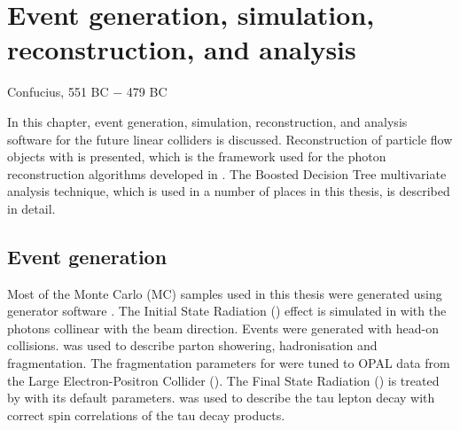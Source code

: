 \chapter{Event generation, simulation, reconstruction, and analysis}
\label{chap:Reconstruction}

%
{Confucius, 551 BC $-$ 479 BC}%





In this chapter, event generation, simulation, reconstruction, and analysis software for the future linear colliders is discussed. Reconstruction of particle flow objects with \pandora is presented, which is the framework used for the photon reconstruction algorithms developed in . The Boosted Decision Tree multivariate analysis technique, which is used in a number of places in this thesis, is described in detail.



\section{Event generation}
\label{sec:pandoraMC}

Most of the Monte Carlo (MC) samples used in this thesis were generated using \WHIZARD generator software \cite{whizard,Moretti:2001zz}. The Initial State Radiation (\ISR) effect is simulated in \WHIZARD with the \ISR photons  collinear with the beam direction. Events were generated with head-on \ee collisions. \PYTHIA \cite{Sjostrand:1995iq} was used to describe parton showering, hadronisation and fragmentation. The fragmentation parameters for \PYTHIA were tuned to OPAL data \cite{Alexander:1995bk} from the Large Electron-Positron Collider (\LEP). The Final State Radiation (\FSR) is treated by \PYTHIA with its default parameters. \TAUOLA \cite{Jadach:1993hs} was used to describe the tau lepton decay with correct spin correlations of the tau decay products.

